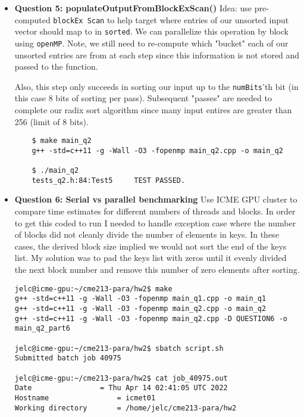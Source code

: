 \documentclass[12pt,letterpaper,twoside]{article}
\begin{document}
\begin{itemize}
    \item \textbf{Question 5: populateOutputFromBlockExScan()} Idea: use pre-computed
    \texttt{blockEx Scan} to help target where entries of our unsorted input vector
    should map to in \texttt{sorted}. We can parallelize this operation by block using 
    \texttt{openMP}. Note, we still need to re-compute which "bucket" each of our unsorted 
    entries are from at each step since this information is not stored and passed to the 
    function. 
    
    Also, this step only succeeds in sorting our input up to the \texttt{numBits}'th 
    bit (in this case 8 bits of sorting per pass). Subsequent "passes" are needed to complete
    our radix sort algorithm since many input entires are greater than 256 (limit of 8 bits).

    \begin{verbatim}
    $ make main_q2
    g++ -std=c++11 -g -Wall -O3 -fopenmp main_q2.cpp -o main_q2

    $ ./main_q2
    tests_q2.h:84:Test5     TEST PASSED.
    \end{verbatim}

    \item \textbf{Question 6: Serial vs parallel benchmarking} Use ICME GPU cluster to 
    compare time estimates for different numbers of threads and blocks. In order to get 
    this coded to run I needed to handle exception case where the number of blocks did 
    not cleanly divide the number of elements in keys. In these cases, the derived block 
    size implied we would not sort the end of the keys list. My solution was to pad the 
    keys list with zeros until it evenly divided the next block number and remove this 
    number of zero elements after sorting.

\begin{verbatim}
jelc@icme-gpu:~/cme213-para/hw2$ make
g++ -std=c++11 -g -Wall -O3 -fopenmp main_q1.cpp -o main_q1
g++ -std=c++11 -g -Wall -O3 -fopenmp main_q2.cpp -o main_q2
g++ -std=c++11 -g -Wall -O3 -fopenmp main_q2.cpp -D QUESTION6 -o main_q2_part6

jelc@icme-gpu:~/cme213-para/hw2$ sbatch script.sh 
Submitted batch job 40975

jelc@icme-gpu:~/cme213-para/hw2$ cat job_40975.out 
Date				= Thu Apr 14 02:41:05 UTC 2022
Hostname				= icmet01
Working directory 		= /home/jelc/cme213-para/hw2


\end{verbatim}
\end{itemize}
\end{document}
